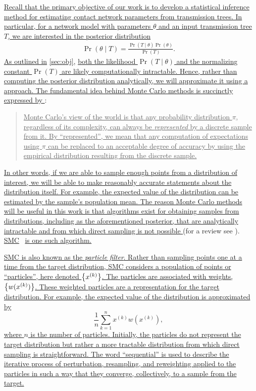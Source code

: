 {\color{blue}\uline{
Recall that the primary objective of our work is to develop a statistical
inference method for estimating contact network parameters from transmission
trees. In particular, for a network model with parameters $\theta$ and an input
transmission tree $T$, we are interested in the posterior distribution}
\begin{align}
  \Pr(\theta \mid T) = \frac{\Pr(T \mid \theta) \Pr(\theta)}{\Pr(T)}.
  \label{eq:post}
\end{align}
\uline{As outlined in} \cref{sec:obj}, \uline{both the likelihood $\Pr(T \mid
\theta)$ and the normalizing constant $\Pr(T)$ are likely computationally
intractable. Hence, rather than computing the posterior distribution
analytically, we will approximate it using a  approach.
The fundamental idea behind Monte Carlo methods is succinctly expressed by
\textcite{liu2001theoretical}}:
\begin{quote}
    \uline{Monte Carlo's view of the world is that any probability distribution $\pi$, 
    regardless of its complexity, can always be \emph{represented} by a
    discrete sample from it. By ``represented'', we mean that any computation
    of expectations using $\pi$ can be replaced to an acceptable degree of
    accuracy by using the empirical distribution resulting from the discrete
    sample.}
\end{quote}
\uline{In other words, if we are able to sample enough points from a
distribution of interest, we will be able to make reasonably accurate
statements about the distribution itself. For example, the expected value of
the distribution can be estimated by the sample's population mean. The reason
Monte Carlo methods will be useful in this work is that algorithms exist for
obtaining samples from distributions, including as the aforementioned
posterior, that are analytically intractable and from which direct sampling is
not possible } (for a review see \autocite{robert2004monte}).
\uline{\Gls{SMC}}~\autocite{doucet2000sequential, doucet2001introduction,
liu2008monte} \uline{is one such algorithm.}
  
\uline{ \Gls{SMC} is also known as the \emph{particle filter}. Rather than
sampling points one at a time from the target distribution, \gls{SMC} considers
a population of points or ``particles'', here denoted $\left\lbrace x^{(k)}\right\rbrace$. The
particles are associated with weights, $\left\lbrace w(x^{(k)})\right\rbrace$. These weighted
particles are a representation for the target distribution. For example, the 
expected value of the distribution is approximated by}
\[
  \frac{1}{n} \sum_{k=1}^n x^{(k)} w(x^{(k)}),
\]
\uline{where $n$ is the number of particles. Initially, the particles do not
represent the target distribution but rather a more tractable distribution from
which direct sampling is straightforward. The word ``sequential'' is used to
describe the iterative process of perturbation, resampling, and reweighting
applied to the particles in such a way that they converge, collectively, to a
sample from the target. }

}

